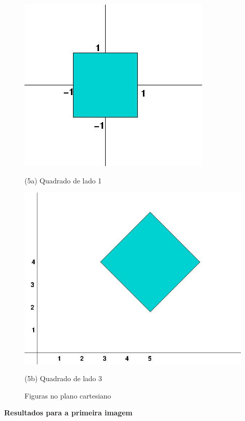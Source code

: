 \documentclass[12pt]{article}
\begin{document}
\begin{itemize}
\begin{itemize}
\begin{figure}[htb]
    \centering
    \begin{minipage}[b]{0.45\textwidth}
    	\centering
            \includegraphics[scale=0.2]{Q3Images/square1.jpg} 
    	\centerline{\small (5a) Quadrado de lado 1}
    \end{minipage}
    \begin{minipage}[b]{0.45\textwidth}
    	\centering
            \includegraphics[scale=0.3]{Q3Images/square3.jpg} 
    	\centerline{\small (5b) Quadrado de lado 3}
    \end{minipage}
\caption{Figuras no plano cartesiano}
\label{fig:fig5}
\end{figure}

\textbf{Resultados para a primeira imagem}


\end{itemize}
\end{itemize}
\end{document}
